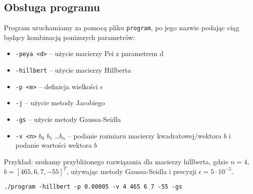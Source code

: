 \documentclass[a4paper,11pt]{article}
\begin{document}
    \subsection{Obsługa programu}
    Program uruchamiamy za pomocą pliku \texttt{program}, po jego nazwie podając ciąg będący kombinacją ponizszych parametrów:
    \begin{itemize}
      \item \texttt{-peya <d>} -- użycie macierzy Pei z parametrem d
      \item \texttt{-hillbert} -- użycie macierzy Hillberta
      \item \texttt{-p <e>} -- definicja wielkości $\epsilon$
      \item \texttt{-j} -- użycie metody Jacobiego
      \item \texttt{-gs} -- użycie metody Gaussa-Seidla
      \item \texttt{-v <n>} $b_0$ $b_1$ \dots $b_n$ -- podanie rozmiaru macierzy kwadratowej/wektora $b$ i podanie wartości wektora $b$
      
    \end{itemize}
    
    Przykład: szukamy przybliżonego rozwiązania dla macierzy hillberta, gdzie $ n = 4 $, $ b = [465, 6, 7, -55]^T $, używając metody Gaussa-Seidla i precyzji $ \epsilon = 5 \cdot 10^{-5} $.
    \begin{center}
      \texttt{./program -hillbert -p 0.00005 -v 4 465 6 7 -55 -gs}
    \end{center}

 
\end{document}
